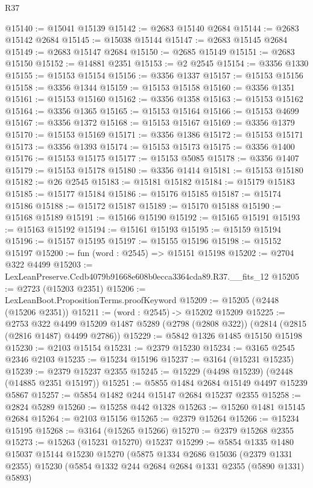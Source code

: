 \begin{lexlean}{R37}
\begin{coremodule}
@15140 := @15041 @15139
@15142 := @2683 @15140 @2684
@15144 := @2683 @15142 @2684
@15145 := @15038 @15144
@15147 := @2683 @15145 @2684
@15149 := @2683 @15147 @2684
@15150 := @2685 @15149
@15151 := @2683 @15150
@15152 := @14881 @2351
@15153 := @2 @2545
@15154 := @3356 @1330
@15155 := @15153 @15154
@15156 := @3356 @1337
@15157 := @15153 @15156
@15158 := @3356 @1344
@15159 := @15153 @15158
@15160 := @3356 @1351
@15161 := @15153 @15160
@15162 := @3356 @1358
@15163 := @15153 @15162
@15164 := @3356 @1365
@15165 := @15153 @15164
@15166 := @15153 @4699
@15167 := @3356 @1372
@15168 := @15153 @15167
@15169 := @3356 @1379
@15170 := @15153 @15169
@15171 := @3356 @1386
@15172 := @15153 @15171
@15173 := @3356 @1393
@15174 := @15153 @15173
@15175 := @3356 @1400
@15176 := @15153 @15175
@15177 := @15153 @5085
@15178 := @3356 @1407
@15179 := @15153 @15178
@15180 := @3356 @1414
@15181 := @15153 @15180
@15182 := @26 @2545
@15183 := @15181 @15182
@15184 := @15179 @15183
@15185 := @15177 @15184
@15186 := @15176 @15185
@15187 := @15174 @15186
@15188 := @15172 @15187
@15189 := @15170 @15188
@15190 := @15168 @15189
@15191 := @15166 @15190
@15192 := @15165 @15191
@15193 := @15163 @15192
@15194 := @15161 @15193
@15195 := @15159 @15194
@15196 := @15157 @15195
@15197 := @15155 @15196
@15198 := @15152 @15197
@15200 := fun (word : @2545) => @15151 @15198
@15202 := @2704 @322 @4499
@15203 := LexLeanPreserve.Ccdb4079b91668e608b0ecca3364cda89.R37.__fits_12
@15205 := @2723 (@15203 @2351)
@15206 := LexLeanBoot.PropositionTerms.proofKeyword
@15209 := @15205 (@2448 (@15206 @2351))
@15211 := (word : @2545) -> @15202 @15209
@15225 := @2753
    @322
    @4499
    @15209
    @1487
    @5289
    (@2798 (@2808 @322))
    (@2814 (@2815 (@2816 @1487) @4499 @2786))
@15229 := @5842 @1326 @1485 @15150 @15198
@15230 := @2103 @15154
@15231 := @2379 @15230
@15234 := @3165 @2545 @2346 @2103
@15235 := @15234 @15196
@15237 := @3164 (@15231 @15235)
@15239 := @2379 @15237 @2355
@15245 := @15229 (@4498 @15239) (@2448 (@14885 @2351 @15197))
@15251 := @5855 @1484 @2684 @15149 @4497 @15239 @5867
@15257 := @5854 @1482 @244 @15147 @2684 @15237 @2355
@15258 := @2824 @5289
@15260 := @15258 @442 @1328
@15263 := @15260 @1481 @15145 @2684
@15264 := @2103 @15156
@15265 := @2379 @15264
@15266 := @15234 @15195
@15268 := @3164 (@15265 @15266)
@15270 := @2379 @15268 @2355
@15273 := @15263 (@15231 @15270) @15237
@15299 := @5854
    @1335
    @1480
    @15037
    @15144
    @15230
    @15270
    (@5875
      @1334
      @2686
      @15036
      (@2379 @1331 @2355)
      @15230
      (@5854 @1332 @244 @2684 @2684 @1331 @2355 (@5890 @1331) @5893)

\end{coremodule}
\end{lexlean}
